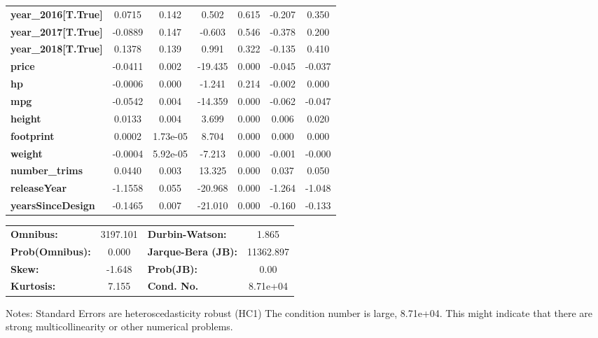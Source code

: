 \begin{center}
\begin{tabular}{lcccccc}
\textbf{year\_2016[T.True]} &       0.0715  &        0.142     &     0.502  &         0.615        &       -0.207    &        0.350     \\
\textbf{year\_2017[T.True]} &      -0.0889  &        0.147     &    -0.603  &         0.546        &       -0.378    &        0.200     \\
\textbf{year\_2018[T.True]} &       0.1378  &        0.139     &     0.991  &         0.322        &       -0.135    &        0.410     \\
\textbf{price}              &      -0.0411  &        0.002     &   -19.435  &         0.000        &       -0.045    &       -0.037     \\
\textbf{hp}                 &      -0.0006  &        0.000     &    -1.241  &         0.214        &       -0.002    &        0.000     \\
\textbf{mpg}                &      -0.0542  &        0.004     &   -14.359  &         0.000        &       -0.062    &       -0.047     \\
\textbf{height}             &       0.0133  &        0.004     &     3.699  &         0.000        &        0.006    &        0.020     \\
\textbf{footprint}          &       0.0002  &     1.73e-05     &     8.704  &         0.000        &        0.000    &        0.000     \\
\textbf{weight}             &      -0.0004  &     5.92e-05     &    -7.213  &         0.000        &       -0.001    &       -0.000     \\
\textbf{number\_trims}      &       0.0440  &        0.003     &    13.325  &         0.000        &        0.037    &        0.050     \\
\textbf{releaseYear}        &      -1.1558  &        0.055     &   -20.968  &         0.000        &       -1.264    &       -1.048     \\
\textbf{yearsSinceDesign}   &      -0.1465  &        0.007     &   -21.010  &         0.000        &       -0.160    &       -0.133     \\
\bottomrule
\end{tabular}
\begin{tabular}{lclc}
\textbf{Omnibus:}       & 3197.101 & \textbf{  Durbin-Watson:     } &     1.865  \\
\textbf{Prob(Omnibus):} &   0.000  & \textbf{  Jarque-Bera (JB):  } & 11362.897  \\
\textbf{Skew:}          &  -1.648  & \textbf{  Prob(JB):          } &      0.00  \\
\textbf{Kurtosis:}      &   7.155  & \textbf{  Cond. No.          } &  8.71e+04  \\
\bottomrule
\end{tabular}
\end{center}

Notes: \newline
 [1] Standard Errors are heteroscedasticity robust (HC1) \newline
 [2] The condition number is large, 8.71e+04. This might indicate that there are \newline
 strong multicollinearity or other numerical problems.